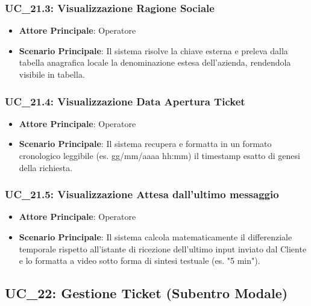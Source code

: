 \subsubsection{UC\_21.3: Visualizzazione Ragione Sociale}
\label{uc_21.3}
\begin{itemize}
    \item \textbf{Attore Principale}: Operatore
    \item \textbf{Scenario Principale}: Il sistema risolve la chiave esterna e preleva dalla tabella anagrafica locale la denominazione estesa dell'azienda, rendendola visibile in tabella.
\end{itemize}

\subsubsection{UC\_21.4: Visualizzazione Data Apertura Ticket}
\label{uc_21.4}
\begin{itemize}
    \item \textbf{Attore Principale}: Operatore
    \item \textbf{Scenario Principale}: Il sistema recupera e formatta in un formato cronologico leggibile (es. gg/mm/aaaa hh:mm) il timestamp esatto di genesi della richiesta.
\end{itemize}

\subsubsection{UC\_21.5: Visualizzazione Attesa dall'ultimo messaggio}
\label{uc_21.5}
\begin{itemize}
    \item \textbf{Attore Principale}: Operatore
    \item \textbf{Scenario Principale}: Il sistema calcola matematicamente il differenziale temporale rispetto all'istante di ricezione dell'ultimo input inviato dal Cliente e lo formatta a video sotto forma di sintesi testuale (es. "5 min").
\end{itemize}


\subsection{UC\_22: Gestione Ticket (Subentro Modale)}
\label{uc_22}

